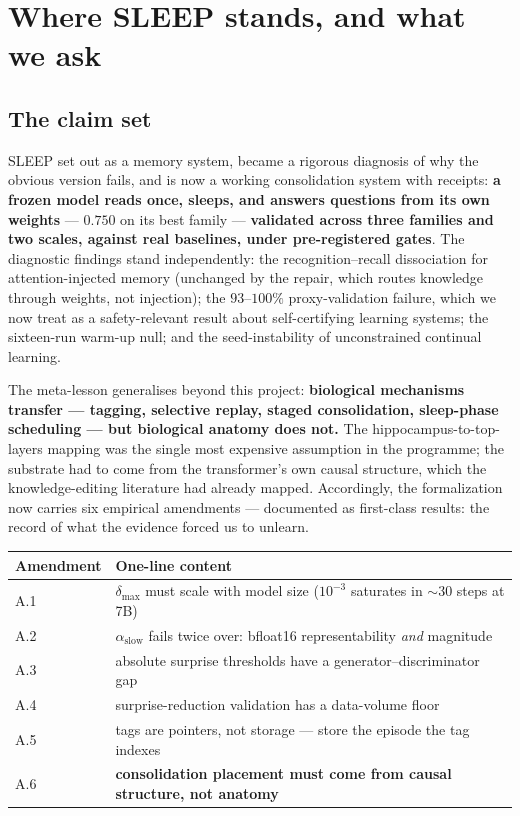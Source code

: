 \documentclass[11pt]{article}
\begin{document}
\section{Where SLEEP stands, and what we ask}

\subsection{The claim set}

SLEEP set out as a memory system, became a rigorous diagnosis of why the obvious version fails,
and is now a working consolidation system with receipts: \textbf{a frozen model reads once,
sleeps, and answers questions from its own weights} --- $0.750$ on its best family ---
\textbf{validated across three families and two scales, against real baselines, under
pre-registered gates}. The diagnostic findings stand independently: the recognition--recall
dissociation for attention-injected memory (unchanged by the repair, which routes knowledge
through weights, not injection); the $93$--$100\%$ proxy-validation failure, which we now treat as
a safety-relevant result about self-certifying learning systems; the sixteen-run warm-up null; and
the seed-instability of unconstrained continual learning.

The meta-lesson generalises beyond this project: \textbf{biological mechanisms transfer ---
tagging, selective replay, staged consolidation, sleep-phase scheduling --- but biological anatomy
does not.} The hippocampus-to-top-layers mapping was the single most expensive assumption in the
programme; the substrate had to come from the transformer's own causal structure, which the
knowledge-editing literature had already mapped. Accordingly, the formalization now carries six
empirical amendments --- documented as first-class results: the record of what the evidence forced
us to unlearn.

\begin{center}
\small
\begin{tabular}{@{}l l@{}}
\toprule
Amendment & One-line content \\
\midrule
A.1 & $\delta_{\max}$ must scale with model size ($10^{-3}$ saturates in $\sim$30 steps at 7B) \\
A.2 & $\alpha_{\mathrm{slow}}$ fails twice over: bfloat16 representability \emph{and} magnitude \\
A.3 & absolute surprise thresholds have a generator--discriminator gap \\
A.4 & surprise-reduction validation has a data-volume floor \\
A.5 & tags are pointers, not storage --- store the episode the tag indexes \\
A.6 & \textbf{consolidation placement must come from causal structure, not anatomy} \\
\bottomrule
\end{tabular}
\end{center}
\end{document}
